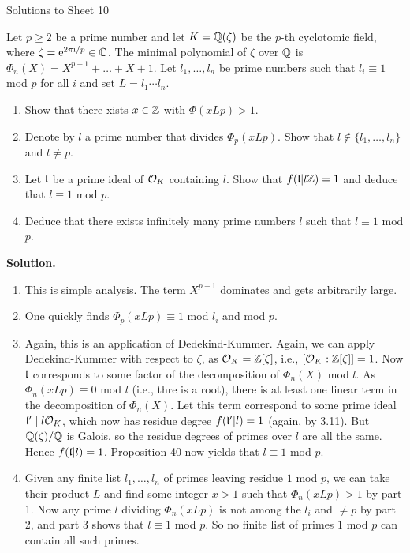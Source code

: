 \documentclass[a4paper,11pt]{article}
\begin{document}
\begin{center}
    \huge{Solutions to Sheet 10}
\end{center}

Let $p\geq 2$ be a prime number and let $K = \mathbb{Q}(\zeta)$ be the $p$-th
cyclotomic field, where $\zeta = \mathrm e^{2 \pi \mathrm i /p} \in \mathbb{C}$. The minimal
polynomial of $\zeta$ over $\mathbb{Q}$ is $\Phi_n(X) = X^{p-1} + \dots + X + 1$.
Let $l_1, \dots, l_n$ be prime numbers such that $l_i \equiv 1$ mod $p$
for all $i$ and set $L = l_1 \cdots l_n$.
\begin{enumerate}
    \item Show that there xists $x \in \mathbb{Z}$ with $\Phi(xLp)>1$. 
    \item Denote by $l$ a prime number that divides $\Phi_p(xLp)$. 
        Show that $l \not \in \{l_1, \dots, l_n\}$ and $l \neq p$. 
    \item Let $\mathfrak{l}$ be a prime ideal of $\mathcal{O}_K$ containing $l$. Show that 
        $f(\mathfrak{l}|l\mathbb{Z}) = 1$ and deduce that $l \equiv 1$ mod $p$.
    \item Deduce that there exists infinitely many prime numbers $l$
        such that $l \equiv 1$ mod $p$.
\end{enumerate}
\textbf{Solution.}
\begin{enumerate}[labelindent=0pt, wide]
    \item This is simple analysis. The term $X^{p-1}$ dominates and gets arbitrarily 
        large.
    \item One quickly finds $\Phi_p(xLp) \equiv 1$ mod $l_i$ and mod $p$.
    \item Again, this is an application of Dedekind-Kummer. Again, we can apply 
        Dedekind-Kummer with respect to $\zeta$, as $\mathcal{O}_K = \mathbb{Z}[\zeta]$, i.e.,
        $[\mathcal{O}_K:\mathbb{Z}[\zeta]] = 1$. Now $\mathfrak{l}$ corresponds to some factor of the 
        decomposition of $\Phi_n(X)$ mod $l$. As $\Phi_n(xLp) \equiv 0$ mod $l$ (i.e.,
        thre is a root), there is at least one linear term in the decomposition
        of $\Phi_n(X)$. Let this term correspond to some prime ideal $\mathfrak{l}' \mid
        l\mathcal{O}_K$, which now has residue degree $f(\mathfrak{l}'|l) = 1$ (again, by 3.11). 
        But $\mathbb{Q}(\zeta)/\mathbb{Q}$ is Galois, so the residue degrees of primes over $l$ are
        all the same. Hence $f(\mathfrak{l}|l) = 1$. Proposition 40 now yields that $l \equiv 1$ 
        mod $p$.
    \item Given any finite list $l_1, \dots, l_n$ of primes leaving residue  
        $1$ mod $p$, we can take their product $L$ and find some integer 
        $x > 1$ such that $\Phi_n(xLp) > 1$ by part 1. Now any prime $l$ dividing
        $\Phi_n(xLp)$ is not among the $l_i$ and $\neq p$ by part 2, and 
        part 3 shows that $l \equiv 1$ mod $p$. So no finite list of primes $1$ mod $p$
        can contain all such primes.


\end{enumerate}
\end{document}
